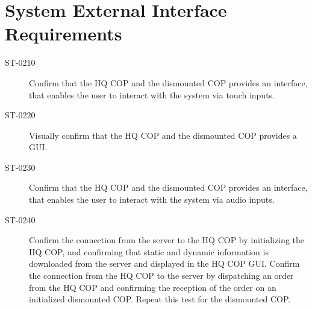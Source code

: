 \section{System External Interface Requirements}

\begin{description}
  \item[ST-0210] Confirm that the HQ COP and the dismounted COP provides an interface, that enables the user to interact with the system via touch inputs.
  \item[ST-0220] Visually confirm that the HQ COP and the dismounted COP provides a GUI. 
  \item[ST-0230] Confirm that the HQ COP and the dismounted COP provides an interface, that enables the user to interact with the system via audio inputs.
  \item[ST-0240] Confirm the connection from the server to the HQ COP by initializing the HQ COP, and confirming that static and dynamic information is downloaded from 					 the server and displayed in the HQ COP GUI. Confirm the connection from the HQ COP to the server by dispatching an order from the HQ COP and confirming 				 the reception of the order on an initialized dismounted COP. Repeat this test for the dismounted COP.
\end{description}